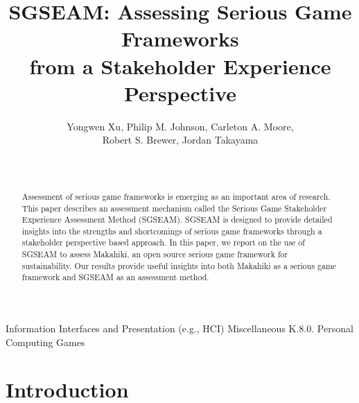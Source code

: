 \documentclass{sigchi}
\begin{document}
\title{SGSEAM: Assessing Serious Game Frameworks\\ from a Stakeholder Experience Perspective}

\author{
  Yongwen Xu, Philip M. Johnson, Carleton A. Moore, \\
Robert S. Brewer, Jordan Takayama\\
    \\
    \\
}

\maketitle

\begin{abstract}
Assessment of serious game frameworks is emerging as an important area of research. 
This paper describes an assessment mechanism called the Serious Game Stakeholder Experience
Assessment Method (SGSEAM). SGSEAM is designed to provide detailed insights into the strengths
and shortcomings of serious game frameworks through a stakeholder perspective based approach.
In this paper, we report on the use of SGSEAM to assess Makahiki, an open source serious game
framework for sustainability. Our results provide useful insights into both Makahiki as a serious game framework and SGSEAM as an assessment method.
\end{abstract}


 {Information Interfaces and Presentation (e.g., HCI)} {Miscellaneous K.8.0.  Personal Computing Games}




\section{Introduction}
\end{document}
